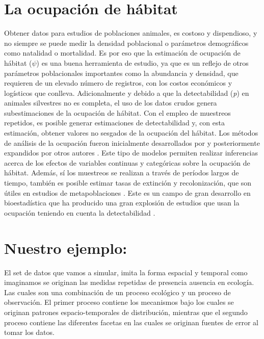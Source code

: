 \documentclass[
]{book}
\begin{document}
\hypertarget{occu}{%
\chapter{La ocupación de hábitat}\label{occu}}

Obtener datos para estudios de poblaciones animales, es costoso y dispendioso, y no siempre se puede medir la densidad poblacional o parámetros demográficos como natalidad o mortalidad. Es por eso que la estimación de ocupación de hábitat (\(\psi\)) es una buena herramienta de estudio, ya que es un reflejo de otros parámetros poblacionales importantes como la abundancia y densidad, que requieren de un elevado número de registros, con los costos económicos y logísticos que conlleva. Adicionalmente y debido a que la detectabilidad (\emph{p}) en animales silvestres no es completa, el uso de los datos crudos genera subestimaciones de la ocupación de hábitat. Con el empleo de muestreos repetidos, es posible generar estimaciones de detectabilidad y, con esta estimación, obtener valores no sesgados de la ocupación del hábitat. Los métodos de análisis de la ocupación fueron inicialmente desarrollados por \citep{MacKenzie2002} y posteriormente expandidos por otros autores \citep{MACKENZIE2005, MacKenzie2006, Kery2008, Royle2007a, Royle2005, Royle2006}. Este tipo de modelos permiten realizar inferencias acerca de los efectos de variables continuas y categóricas sobre la ocupación de hábitat. Además, sí los muestreos se realizan a través de períodos largos de tiempo, también es posible estimar tasas de extinción y recolonización, que son útiles en estudios de metapoblaciones \citep{MacKenzie2003}. Este es un campo de gran desarrollo en bioestadística que ha producido una gran explosión de estudios que usan la ocupación teniendo en cuenta la detectabilidad \citep{Guillera-Arroita2010a, Guillera-Arroita2015, Guillera-Arroita2011, Guillera-Arroita2012, Guillera-Arroita2014a, Kery2013}.

\hypertarget{example}{%
\chapter{Nuestro ejemplo:}\label{example}}

El set de datos que vamos a simular, imita la forma espacial y temporal como imaginamos se originan las medidas repetidas de presencia ausencia en ecología. Las cuales son una combinación de un proceso ecológico y un proceso de observación. El primer proceso contiene los mecanismos bajo los cuales se originan patrones espacio-temporales de distribución, mientras que el segundo proceso contiene las diferentes facetas en las cuales se originan fuentes de error al tomar los datos.
\end{document}
